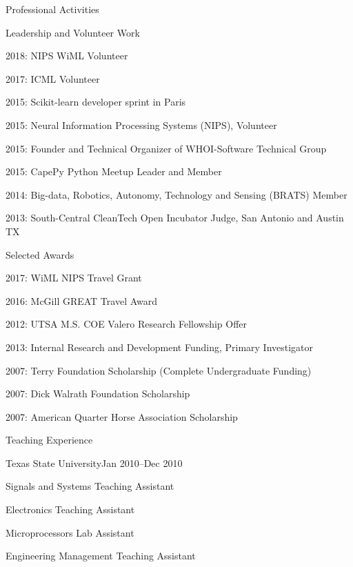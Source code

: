 \documentclass{resume} %
\begin{document}
\begin{rSection}{Professional Activities}
\begin{rSubsection}{Leadership and Volunteer Work}{}{}{}
\item{2018: NIPS WiML Volunteer}
\item{2017: ICML Volunteer}
\item{2015: Scikit-learn developer sprint in Paris}
\item{2015: Neural Information Processing Systems (NIPS), Volunteer}
\item{2015: Founder and Technical Organizer of WHOI-Software Technical Group}
\item{2015: CapePy Python Meetup Leader and Member}
\item{2014: Big-data, Robotics, Autonomy, Technology and Sensing (BRATS) Member}
\item{2013: South-Central CleanTech Open Incubator Judge, San Antonio and Austin TX}
\end{rSubsection}

\begin{rSubsection}{Selected Awards}{}{}{}
\item{2017: WiML NIPS Travel Grant} 
\item{2016: McGill GREAT Travel Award} 
\item{2012: UTSA M.S. COE Valero Research Fellowship Offer}
\item{2013: Internal Research and Development Funding, Primary Investigator} 
\item{2007: Terry Foundation Scholarship (Complete Undergraduate Funding)} 
\item{2007: Dick Walrath Foundation Scholarship} 
\item{2007: American Quarter Horse Association Scholarship} 
\end{rSubsection}
\end{rSection}
\begin{rSection}{Teaching Experience}
\begin{rSubsection}{Texas State University}{Jan 2010--Dec 2010}{}{}
\item{Signals and Systems Teaching Assistant}
\item{Electronics Teaching Assistant}
\item{Microprocessors Lab Assistant}
\item{Engineering Management Teaching Assistant}
\end{rSubsection}
\end{rSection}




\end{document}
